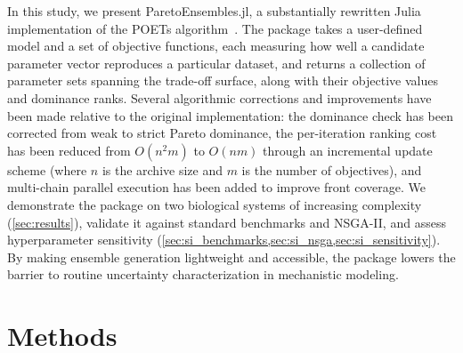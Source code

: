 \documentclass[12pt]{article}
\begin{document}
In this study, we present ParetoEnsembles.jl, a substantially rewritten Julia implementation of the POETs algorithm~\cite{Song2010,Bassen2016}. The package takes a user-defined model and a set of objective functions, each measuring how well a candidate parameter vector reproduces a particular dataset, and returns a collection of parameter sets spanning the trade-off surface, along with their objective values and dominance ranks. Several algorithmic corrections and improvements have been made relative to the original implementation: the dominance check has been corrected from weak to strict Pareto dominance, the per-iteration ranking cost has been reduced from $O(n^{2}m)$ to $O(nm)$ through an incremental update scheme (where $n$ is the archive size and $m$ is the number of objectives), and multi-chain parallel execution has been added to improve front coverage. We demonstrate the package on two biological systems of increasing complexity (\cref{sec:results}), validate it against standard benchmarks and NSGA-II, and assess hyperparameter sensitivity (\cref{sec:si_benchmarks,sec:si_nsga,sec:si_sensitivity}). By making ensemble generation lightweight and accessible, the package lowers the barrier to routine uncertainty characterization in mechanistic modeling.

\section{Methods}\label{sec:methods}
\end{document}
